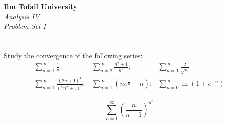 \documentclass[12pt]{article}
\begin{document}
\begin{center}
\Large\textbf{Ibn Tofail University} \\[1em]
\large\textit{Analysis IV} \\[2em]
\large\textit{Problem Set I} \\[0.5em]
\end{center}

\vspace{1cm}
\section{}
Study the convergence of the following series:
\[
\begin{array}{lll}
\displaystyle \sum_{n=1}^{\infty} \frac{1}{n}; &
\displaystyle \sum_{n=2}^{\infty} \frac{n^2 + 1}{n^2}; &
\displaystyle \sum_{n=1}^{\infty} \frac{2}{\sqrt{n}} \\[1.5em]
\displaystyle \sum_{n=1}^{\infty} \frac{(2n + 1)^4}{(7n^2 + 1)^3}; &
\displaystyle \sum_{n=1}^{\infty} \left( ne^{\frac{1}{n}} - n \right); &
\displaystyle \sum_{n=0}^{\infty} \ln\left(1 + e^{-n}\right)
\end{array}
\]

\[
\displaystyle \sum_{n=1}^{\infty} \left( \frac{n}{n + 1} \right)^{n^2}
\]
\end{document}
